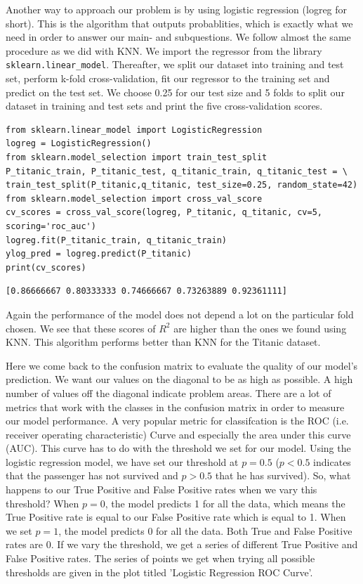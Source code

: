 \documentclass[11pt]{article}
\begin{document}
Another way to approach our problem is by using logistic regression (logreg for short). This is the algorithm that outputs probablities, which is exactly what we need in order to answer our main- and subquestions. We follow almost the same procedure as we did with KNN. We import the regressor from the library \texttt{sklearn.linear\_model}. Thereafter, we split our dataset into training and test set, perform k-fold cross-validation, fit our regressor to the training set and predict on the test set. We choose 0.25 for our test size and 5 folds to split our dataset in training and test sets and print the five cross-validation scores. 


\begin{verbatim}
from sklearn.linear_model import LogisticRegression
logreg = LogisticRegression()
from sklearn.model_selection import train_test_split
P_titanic_train, P_titanic_test, q_titanic_train, q_titanic_test = \
train_test_split(P_titanic,q_titanic, test_size=0.25, random_state=42)
from sklearn.model_selection import cross_val_score
cv_scores = cross_val_score(logreg, P_titanic, q_titanic, cv=5, scoring='roc_auc')
logreg.fit(P_titanic_train, q_titanic_train)
ylog_pred = logreg.predict(P_titanic)
print(cv_scores)
\end{verbatim}

\begin{verbatim}
[0.86666667 0.80333333 0.74666667 0.73263889 0.92361111]

\end{verbatim}

Again the performance of the model does not depend a lot on the particular fold chosen. We see that these scores of \(R^{2}\) are higher than the ones we found using KNN. This algorithm performs better than KNN for the Titanic dataset. 

Here we come back to the confusion matrix to evaluate the quality of our model's prediction. We want our values on the diagonal to be as high as possible. A high number of values off the diagonal indicate problem areas. There are a lot of metrics that work with the classes in the confusion matrix in order to measure our model performance. A very popular metric for classifcation is the ROC (i.e. receiver operating characteristic) Curve and especially the area under this curve (AUC). This curve has to do with the threshold we set for our model. Using the logistic regression model, we have set our threshold at \(p=0.5\) (\(p<0.5\) indicates that the passenger has not survived and \(p>0.5\) that he has survived). So, what happens to our True Positive and False Positive rates when we vary this threshold? When \(p=0\), the model predicts 1 for all the data, which means the True Positive rate is equal to our False Positive rate which is equal to 1. When we set \(p=1\), the model predicts 0 for all the data. Both True and False Positive rates are 0. If we vary the threshold, we get a series of different True Positive and False Positive rates. The series of points we get when trying all possible thresholds are given in the plot titled 'Logistic Regression ROC Curve'. 
\end{document}
